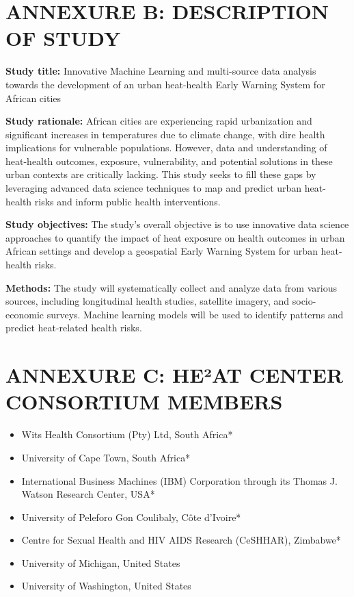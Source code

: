 \documentclass[12pt,letterpaper]{article}
\begin{document}
\section*{ANNEXURE B: DESCRIPTION OF STUDY}

\textbf{Study title:} Innovative Machine Learning and multi-source data analysis towards the development of an urban heat-health Early Warning System for African cities

\textbf{Study rationale:} African cities are experiencing rapid urbanization and significant increases in temperatures due to climate change, with dire health implications for vulnerable populations. However, data and understanding of heat-health outcomes, exposure, vulnerability, and potential solutions in these urban contexts are critically lacking. This study seeks to fill these gaps by leveraging advanced data science techniques to map and predict urban heat-health risks and inform public health interventions.

\textbf{Study objectives:} The study's overall objective is to use innovative data science approaches to quantify the impact of heat exposure on health outcomes in urban African settings and develop a geospatial Early Warning System for urban heat-health risks.

\textbf{Methods:} The study will systematically collect and analyze data from various sources, including longitudinal health studies, satellite imagery, and socio-economic surveys. Machine learning models will be used to identify patterns and predict heat-related health risks.

\section*{ANNEXURE C: HE²AT CENTER CONSORTIUM MEMBERS}

\begin{itemize}
    \item Wits Health Consortium (Pty) Ltd, South Africa*
    \item University of Cape Town, South Africa*
    \item International Business Machines (IBM) Corporation through its Thomas J. Watson Research Center, USA*
    \item University of Peleforo Gon Coulibaly, Côte d'Ivoire*
    \item Centre for Sexual Health and HIV AIDS Research (CeSHHAR), Zimbabwe*
    \item University of Michigan, United States
    \item University of Washington, United States
\end{itemize}
\end{document}
